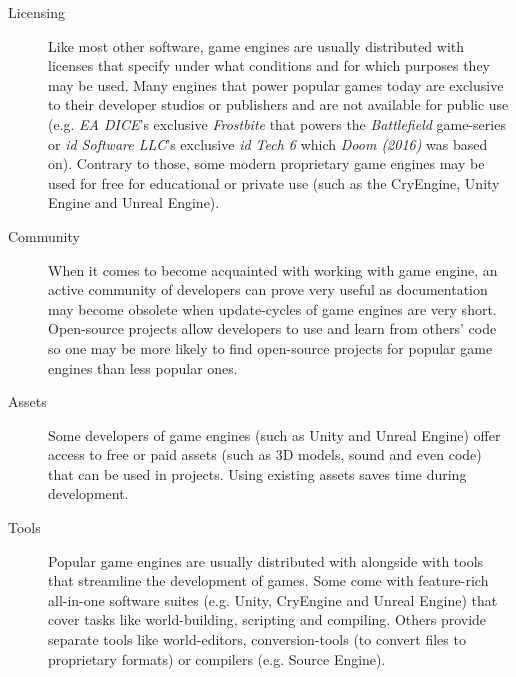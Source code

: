 \begin{description}
\item [Licensing] Like most other software, game engines are usually distributed with licenses that specify under what conditions and for which purposes they may be used. Many engines that power popular games today are exclusive to their developer studios or publishers and are not available for public use (e.g. \textit{EA DICE}'s exclusive \textit{Frostbite} that powers the \textit{Battlefield} game-series or \textit{id Software LLC}'s exclusive \textit{id Tech 6} which \textit{Doom (2016)} was based on). Contrary to those, some modern proprietary game engines may be used for free for educational or private use (such as the CryEngine, Unity Engine and Unreal Engine).
\item [Community] When it comes to become acquainted with working with game engine, an active community of developers can prove very useful as documentation may become obsolete when update-cycles of game engines are very short. Open-source projects allow developers to use and learn from others' code so one may be more likely to find open-source projects for popular game engines than less popular ones.
\item [Assets] Some developers of game engines (such as Unity and Unreal Engine) offer access to free or paid assets (such as 3D models, sound and even code) that can be used in projects. Using existing assets saves time during development.
\item [Tools] Popular game engines are usually distributed with alongside with tools that streamline the development of games. Some come with feature-rich all-in-one software suites (e.g. Unity, CryEngine and Unreal Engine) that cover tasks like world-building, scripting and compiling. Others provide separate tools like world-editors, conversion-tools (to convert files to proprietary formats) or compilers (e.g. Source Engine).
\end{description}

